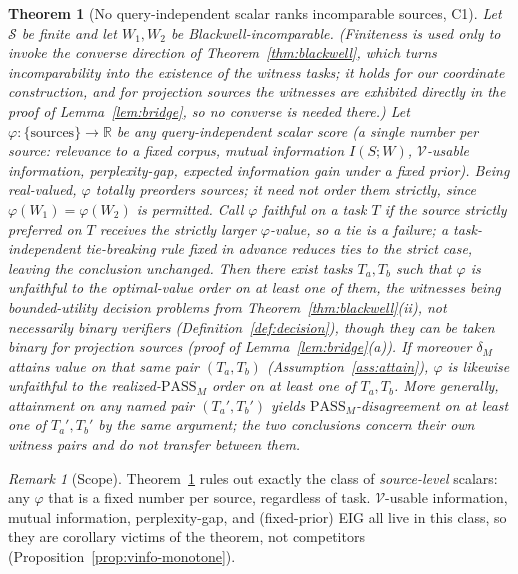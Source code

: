 \documentclass[11pt]{article}
\theoremstyle{plain}
\newtheorem{theorem}{Theorem}
\theoremstyle{definition}
\theoremstyle{remark}
\newtheorem{remark}{Remark}
\newcommand{\PASS}{\mathrm{PASS}}
\newcommand{\Scal}{\mathcal{S}}
\newcommand{\Vcal}{\mathcal{V}}
\begin{document}
\begin{theorem}[No query-independent scalar ranks incomparable sources, C1]
\label{thm:incomparable}
Let $\Scal$ be finite and let $W_1, W_2$ be Blackwell-incomparable. (Finiteness is used only to
invoke the converse direction of Theorem~\ref{thm:blackwell}, which turns incomparability into the
existence of the witness tasks; it holds for our coordinate construction, and for projection
sources the witnesses are exhibited directly in the proof of Lemma~\ref{lem:bridge}, so no
converse is needed there.) Let $\varphi : \{\text{sources}\} \to \mathbb R$ be any
\emph{query-independent} scalar score (a single number per source: relevance to a fixed corpus,
mutual information $I(S;W)$, $\Vcal$-usable information, perplexity-gap, expected information gain
under a fixed prior). Being real-valued, $\varphi$ totally \emph{preorders} sources; it need not order them strictly,
since $\varphi(W_1)=\varphi(W_2)$ is permitted. Call $\varphi$ \emph{faithful on a task $T$} if the
source strictly preferred on $T$ receives the strictly larger $\varphi$-value, so a tie is a
failure; a task-independent tie-breaking rule fixed in advance reduces ties to the strict case,
leaving the conclusion unchanged. Then there exist tasks $T_a, T_b$ such that $\varphi$ is
unfaithful to the optimal-value order on at least one of them, the witnesses being bounded-utility
decision problems from Theorem~\ref{thm:blackwell}\textup{(ii)}, not necessarily binary verifiers
(Definition~\ref{def:decision}), though they can be taken binary for projection sources (proof of
Lemma~\ref{lem:bridge}\textup{(a)}). If moreover $\delta_M$ attains value on \emph{that same} pair
$(T_a,T_b)$ (Assumption~\ref{ass:attain}), $\varphi$ is likewise unfaithful to the
realized-$\PASS_M$ order on at least one of $T_a, T_b$. More generally, attainment on \emph{any}
named pair $(T_a', T_b')$ yields $\PASS_M$-disagreement on at least one of $T_a', T_b'$ by the same
argument; the two conclusions concern their own witness pairs and do not transfer between them.
\end{theorem}

\begin{remark}[Scope]
\label{rem:c2scope}
Theorem~\ref{thm:incomparable} rules out exactly the class of \emph{source-level} scalars: any
$\varphi$ that is a fixed number per source, regardless of task. $\Vcal$-usable information, mutual
information, perplexity-gap, and (fixed-prior) EIG all live in this class, so they are corollary
victims of the theorem, not competitors (Proposition~\ref{prop:vinfo-monotone}).
\end{remark}
\end{document}
